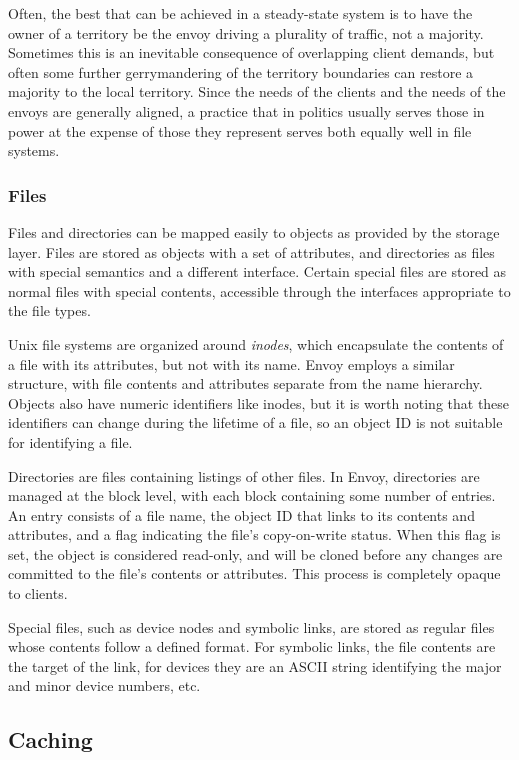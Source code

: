 Often, the best that can be achieved in a steady-state system is to have the owner of a territory be the envoy driving a plurality of traffic, not a majority. Sometimes this is an inevitable consequence of overlapping client demands, but often some further gerrymandering of the territory boundaries can restore a majority to the local territory. Since the needs of the clients and the needs of the envoys are generally aligned, a practice that in politics usually serves those in power at the expense of those they represent serves both equally well in file systems.

\subsubsection{Files}\label{sec:directory-format}

Files and directories can be mapped easily to objects as provided by the storage layer. Files are stored as objects with a set of attributes, and directories as files with special semantics and a different interface. Certain special files are stored as normal files with special contents, accessible through the interfaces appropriate to the file types.

Unix file systems are organized around \emph{inodes}, which encapsulate the contents of a file with its attributes, but not with its name. Envoy employs a similar structure, with file contents and attributes separate from the name hierarchy. Objects also have numeric identifiers like inodes, but it is worth noting that these identifiers can change during the lifetime of a file, so an object ID is not suitable for identifying a file.

Directories are files containing listings of other files. In Envoy, directories are managed at the block level, with each block containing some number of entries. An entry consists of a file name, the object ID that links to its contents and attributes, and a flag indicating the file's copy-on-write status. When this flag is set, the object is considered read-only, and will be cloned before any changes are committed to the file's contents or attributes. This process is completely opaque to clients.

Special files, such as device nodes and symbolic links, are stored as regular files whose contents follow a defined format. For symbolic links, the file contents are the target of the link, for devices they are an ASCII string identifying the major and minor device numbers, etc.

\subsection{Caching}


